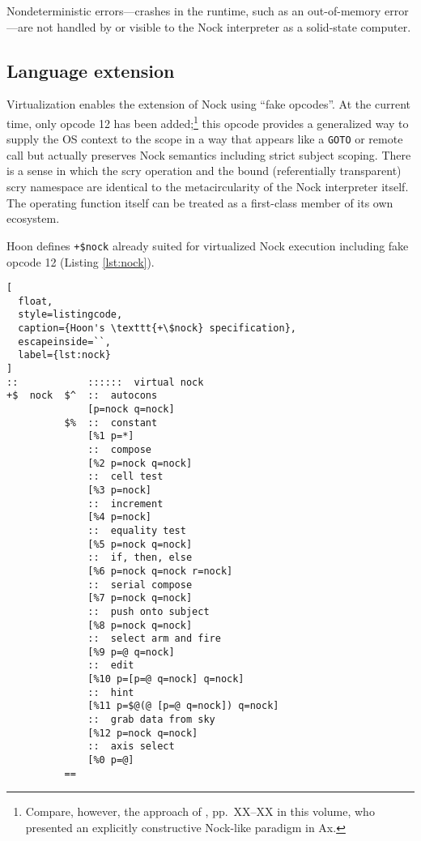 \documentclass[twoside]{article}
\begin{document}
Nondeterministic errors—crashes in the runtime, such as an out-of-memory error—are not handled by or visible to the Nock interpreter as a solid-state computer.



\subsection{Language extension}

Virtualization enables the extension of Nock using ``fake opcodes''.  At the current time, only opcode 12 has been added;\footnote{Compare, however, the approach of \citet{Atman2025}, pp.~XX–XX in this volume, who presented an explicitly constructive Nock-like paradigm in Ax.} this opcode provides a generalized way to supply the OS context to the scope in a way that appears like a \texttt{GOTO} or remote call but actually preserves Nock semantics including strict subject scoping.  There is a sense in which the scry operation and the bound (referentially transparent) scry namespace are identical to the metacircularity of the Nock interpreter itself.  The operating function itself can be treated as a first-class member of its own ecosystem.

Hoon defines \lstinline[style=inlinecode]{+$nock} already suited for virtualized Nock execution including fake opcode 12 (Listing \ref{lst:nock}).

\begin{lstlisting}[
  float,
  style=listingcode,
  caption={Hoon's \texttt{+\$nock} specification},
  escapeinside=``,
  label={lst:nock}
]
::            ::::::  virtual nock
+$  nock  $^  ::  autocons
              [p=nock q=nock]
          $%  ::  constant
              [%1 p=*]
              ::  compose
              [%2 p=nock q=nock]
              ::  cell test
              [%3 p=nock]
              ::  increment
              [%4 p=nock]
              ::  equality test
              [%5 p=nock q=nock]
              ::  if, then, else
              [%6 p=nock q=nock r=nock]
              ::  serial compose
              [%7 p=nock q=nock]
              ::  push onto subject
              [%8 p=nock q=nock]
              ::  select arm and fire
              [%9 p=@ q=nock]
              ::  edit
              [%10 p=[p=@ q=nock] q=nock]
              ::  hint
              [%11 p=$@(@ [p=@ q=nock]) q=nock]
              ::  grab data from sky
              [%12 p=nock q=nock]
              ::  axis select
              [%0 p=@]
          ==
\end{lstlisting}
\end{document}
